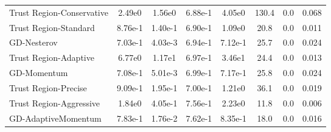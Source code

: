 \documentclass{article}
\begin{document}
\begin{table}[htbp]
{\begin{tabular}{p{2.5cm}*{7}{c}}
Trust Region-Conservative & 2.49e0 & 1.56e0 & 6.88e-1 & 4.05e0 & 130.4 & 0.0 & 0.068 \\
Trust Region-Standard & 8.76e-1 & 1.40e-1 & 6.90e-1 & 1.09e0 & 20.8 & 0.0 & 0.011 \\
GD-Nesterov & 7.03e-1 & 4.03e-3 & 6.94e-1 & 7.12e-1 & 25.7 & 0.0 & 0.024 \\
Trust Region-Adaptive & 6.77e0 & 1.17e1 & 6.97e-1 & 3.46e1 & 24.4 & 0.0 & 0.013 \\
GD-Momentum & 7.08e-1 & 5.01e-3 & 6.99e-1 & 7.17e-1 & 25.8 & 0.0 & 0.024 \\
Trust Region-Precise & 9.09e-1 & 1.95e-1 & 7.00e-1 & 1.21e0 & 36.1 & 0.0 & 0.019 \\
Trust Region-Aggressive & 1.84e0 & 4.05e-1 & 7.56e-1 & 2.23e0 & 11.8 & 0.0 & 0.006 \\
GD-AdaptiveMomentum & 7.83e-1 & 1.76e-2 & 7.62e-1 & 8.35e-1 & 18.0 & 0.0 & 0.016 \\
\bottomrule
\end{tabular}
}
\end{table}
\end{document}
